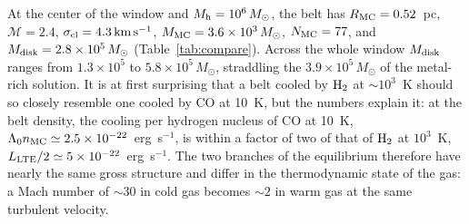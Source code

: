 \documentclass[twocolumn,pdftex]{aastex701}
\newcommand{\msun}{M_{\odot}}
\newcommand{\Mh}{M_{\rm h}}
\newcommand{\kms}{\,{\rm km\,s^{-1}}}
\newcommand{\Htwo}{{\rm H_2}}
\begin{document}
At the center of the window and $\Mh = 10^{6}\,\msun$, the belt has $R_{\rm MC} = 0.52$~pc, $\mathcal{M} = 2.4$, $\sigma_{\rm cl} = 4.3\kms$, $M_{\rm MC} = 3.6\times10^{3}\,\msun$, $N_{\rm MC} = 77$, and $M_{\rm disk} = 2.8\times10^{5}\,\msun$ (Table~\ref{tab:compare}). Across the whole window $M_{\rm disk}$ ranges from $1.3\times10^{5}$ to $5.8\times10^{5}\,\msun$, straddling the $3.9\times10^{5}\,\msun$ of the metal-rich solution. It is at first surprising that a belt cooled by $\Htwo$ at $\sim10^{3}$~K should so closely resemble one cooled by CO at 10~K, but the numbers explain it: at the belt density, the cooling per hydrogen nucleus of CO at 10~K, $\Lambda_0 n_{\rm MC}\simeq2.5\times10^{-22}$~erg~s$^{-1}$, is within a factor of two of that of $\Htwo$ at $10^{3}$~K, $L_{\rm LTE}/2\simeq5\times10^{-22}$~erg~s$^{-1}$. The two branches of the equilibrium therefore have nearly the same gross structure and differ in the thermodynamic state of the gas: a Mach number of $\sim30$ in cold gas becomes $\sim2$ in warm gas at the same turbulent velocity.
\end{document}
